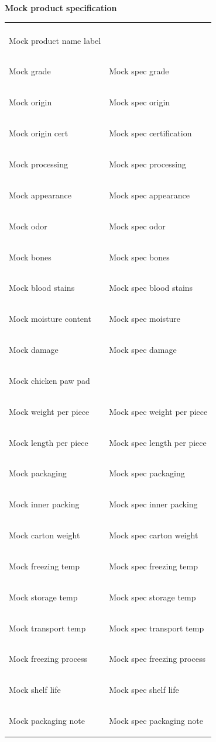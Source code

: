 \documentclass[a4paper,11pt]{article}
\begin{document}
\begin{center}{\large\textbf{\color{marooncolor}Mock product specification}}\end{center}
\vspace{0.1cm}
\begin{center}
\begin{tabularx}{\textwidth}{>{\columncolor{lightgray}\bfseries\raggedright\arraybackslash}p{5.5cm} >{\raggedright\arraybackslash}X}
\multicolumn{1}{>{\columncolor{lightgray}\bfseries\raggedright\arraybackslash}p{5.5cm}}{Mock category} & \multicolumn{1}{>{\bfseries\raggedright\arraybackslash}X}{Mock specification} \\ Mock product name label &  \\ Mock grade & Mock spec grade \\ Mock origin & Mock spec origin \\ Mock origin cert & Mock spec certification \\ Mock processing & Mock spec processing \\ Mock appearance & Mock spec appearance \\ Mock odor & Mock spec odor \\ Mock bones & Mock spec bones \\ Mock blood stains & Mock spec blood stains \\ Mock moisture content & Mock spec moisture \\ Mock damage & Mock spec damage \\ Mock chicken paw pad &  \\ Mock weight per piece & Mock spec weight per piece \\ Mock length per piece & Mock spec length per piece \\ Mock packaging & Mock spec packaging \\ Mock inner packing & Mock spec inner packing \\ Mock carton weight & Mock spec carton weight \\ Mock freezing temp & Mock spec freezing temp \\ Mock storage temp & Mock spec storage temp \\ Mock transport temp & Mock spec transport temp \\ Mock freezing process & Mock spec freezing process \\ Mock shelf life & Mock spec shelf life \\ Mock packaging note & Mock spec packaging note \\ \end{tabularx}
\end{center}
\end{document}
